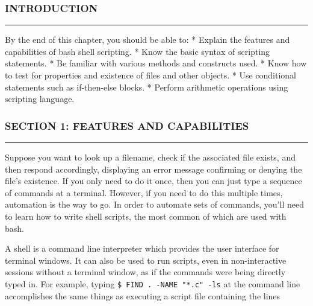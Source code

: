 \subsubsection{INTRODUCTION}\label{introduction-14}

\begin{center}\rule{3in}{0.4pt}\end{center}

By the end of this chapter, you should be able to: * Explain the
features and capabilities of bash shell scripting. * Know the basic
syntax of scripting statements. * Be familiar with various methods and
constructs used. * Know how to test for properties and existence of
files and other objects. * Use conditional statements such as
if-then-else blocks. * Perform arithmetic operations using scripting
language.

\subsubsection{SECTION 1: FEATURES AND
CAPABILITIES}\label{section-1-features-and-capabilities}

\begin{center}\rule{3in}{0.4pt}\end{center}

Suppose you want to look up a filename, check if the associated file
exists, and then respond accordingly, displaying an error message
confirming or denying the file's existence. If you only need to do it
once, then you can just type a sequence of commands at a terminal.
However, if you need to do this multiple times, automation is the way to
go. In order to automate sets of commands, you'll need to learn how to
write shell scripts, the most common of which are used with bash.

A shell is a command line interpreter which provides the user interface
for terminal windows. It can also be used to run scripts, even in
non-interactive sessions without a terminal window, as if the commands
were being directly typed in. For example, typing
\texttt{\$ FIND . -NAME "*.c" -ls} at the command line accomplishes the
same things as executing a script file containing the lines

\begin{Shaded}
\begin{Highlighting}[]
  
\end{Highlighting}
\end{Shaded}

